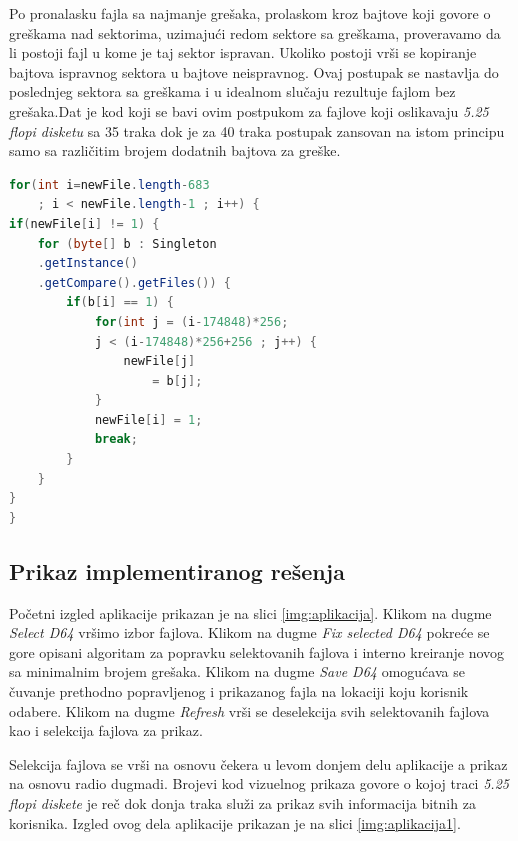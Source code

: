 Po pronalasku fajla sa najmanje grešaka, prolaskom kroz bajtove koji govore o greškama nad sektorima, uzimajući redom sektore sa greškama, proveravamo da li postoji fajl u kome je taj sektor ispravan. Ukoliko postoji vrši se kopiranje bajtova ispravnog sektora u bajtove neispravnog. Ovaj postupak se nastavlja do poslednjeg sektora sa greškama i u idealnom slučaju rezultuje fajlom bez grešaka.Dat je kod koji se bavi ovim postpukom za fajlove koji oslikavaju \textit{5.25 flopi disketu} sa 35 traka dok je za 40 traka postupak zansovan na istom principu samo sa različitim brojem dodatnih bajtova za greške.

\begin{lstlisting}[language=Java]
for(int i=newFile.length-683 
    ; i < newFile.length-1 ; i++) {
if(newFile[i] != 1) {
	for (byte[] b : Singleton
	.getInstance()
	.getCompare().getFiles()) {
		if(b[i] == 1) {
			for(int j = (i-174848)*256;
			j < (i-174848)*256+256 ; j++) {
				newFile[j] 
				    = b[j];
			}
			newFile[i] = 1;
			break;
		}
	}
}
}
\end{lstlisting}

\subsection{Prikaz implementiranog rešenja}

Početni izgled aplikacije prikazan je na slici \ref{img:aplikacija}. Klikom na dugme \textit{Select D64} vršimo izbor fajlova. Klikom na dugme \textit{Fix selected D64} pokreće se gore opisani algoritam za popravku selektovanih fajlova i interno kreiranje novog sa minimalnim brojem grešaka. Klikom na dugme \textit{Save D64} omogućava se čuvanje prethodno popravljenog i prikazanog fajla na lokaciji koju korisnik odabere. Klikom na dugme \textit{Refresh} vrši se deselekcija svih selektovanih fajlova kao i selekcija fajlova za prikaz.

Selekcija fajlova se vrši na osnovu čekera u levom donjem delu aplikacije a prikaz na osnovu radio dugmadi. Brojevi kod vizuelnog prikaza govore o kojoj traci \textit{5.25 flopi diskete} je reč dok donja traka služi za prikaz svih informacija bitnih za korisnika. Izgled ovog dela aplikacije prikazan je na slici \ref{img:aplikacija1}.

